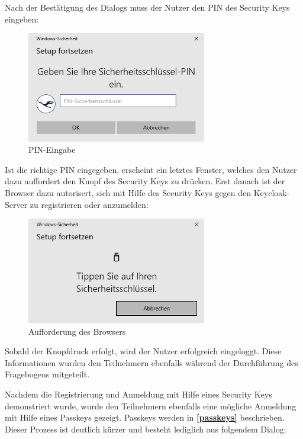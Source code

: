 Nach der Bestätigung des Dialogs muss der Nutzer den PIN des Security Keys eingeben:

\begin{figure}[H]
	\centering 
	\includegraphics[width=0.7\textwidth]{img/abbildungen/reg003.png}
	\captionsetup{format=hang}
	\caption{PIN-Eingabe}
\end{figure}

Ist die richtige PIN eingegeben, erscheint ein letztes Fenster, welches den Nutzer dazu auffordert den Knopf des Security Keys zu drücken. Erst danach ist der Browser dazu autorisert, sich mit Hilfe des Security Keys gegen den Keycloak-Server zu registrieren oder anzumelden:

\begin{figure}[h]
	\centering 
	\includegraphics[width=0.7\textwidth]{img/abbildungen/reg004.png}
	\captionsetup{format=hang}
	\caption{Aufforderung des Browsers}
\end{figure}

Sobald der Knopfdruck erfolgt, wird der Nutzer erfolgreich eingeloggt. Diese Informationen wurden den Teilnehmern ebenfalls während der Durchführung des Fragebogens mitgeteilt. 

Nachdem die Registrierung und Anmeldung mit Hilfe eines Security Keys demonstriert wurde, wurde den Teilnehmern ebenfalls eine mögliche Anmeldung mit Hilfe eines Passkeys gezeigt. Passkeys werden in \textbf{\ref{passkeys}} beschrieben. Dieser Prozess ist deutlich kürzer und besteht lediglich aus folgendem Dialog:

